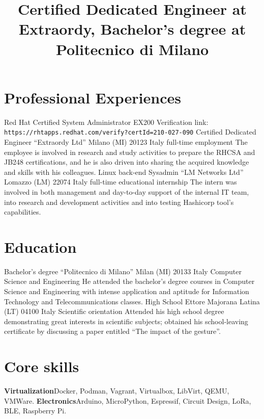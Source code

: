 
\title{\normalsize%
    Certified Dedicated Engineer at Extraordy, Bachelor's degree at Politecnico di Milano
}
\maketitle

\section{Professional Experiences}
    {Red Hat Certified System Administrator}
    {EX200}
    {}
    {}
    {Verification link: \texttt{https://rhtapps.redhat.com/verify?certId=210-027-090}}
    {Certified Dedicated Engineer}
    {``Extraordy Ltd''}
    {Milano (MI) 20123 Italy}
    {full-time employment}
    {The employee is involved in research and study activities to prepare the RHCSA and JB248 certifications, and he is also driven into sharing the acquired knowledge and skills with his colleagues.}
    {Linux back-end Sysadmin}
    {``LM Networks Ltd''}
    {Lomazzo (LM) 22074 Italy}
    {full-time educational internship}
    {The intern was involved in both management and day-to-day support of the internal IT team, into research and development activities and into testing Hashicorp tool's capabilities.}

\section{Education}
    {Bachelor's degree}
    {``Politecnico di Milano''}
    {Milan (MI) 20133 Italy}
    {Computer Science and Engineering}
    {He attended the bachelor's degree courses in Computer Science and Engineering with intense application and aptitude for Information Technology and Telecommunications classes.}
    {High School}
    {Ettore Majorana}
    {Latina (LT) 04100 Italy}
    {Scientific orientation}
    {Attended his high school degree demonstrating great interests in scientific subjects; obtained his school-leaving certificate by discussing a paper entitled ``The impact of the gesture''.}

\section{Core skills}
    {\textbf{Virtualization}}{Docker, Podman, Vagrant, Virtualbox, LibVirt, QEMU, VMWare.}
    {\textbf{Electronics}}{Arduino, MicroPython, Espressif, Circuit Design, LoRa, BLE, Raspberry Pi.}

